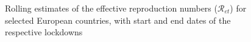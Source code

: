 \documentclass[12pt]{article}
\begin{document}
\begin{figure}[htp]%
\caption{Rolling estimates of the effective reproduction numbers ($\mathcal
{R}_{et}%
$) for selected European countries, with start and end dates of the respective lockdowns}%
\vspace{-0.2cm}%
\label{fig: Euro_Re}%

\begin{footnotesize}%



\end{footnotesize}
\end{figure}
\end{document}
